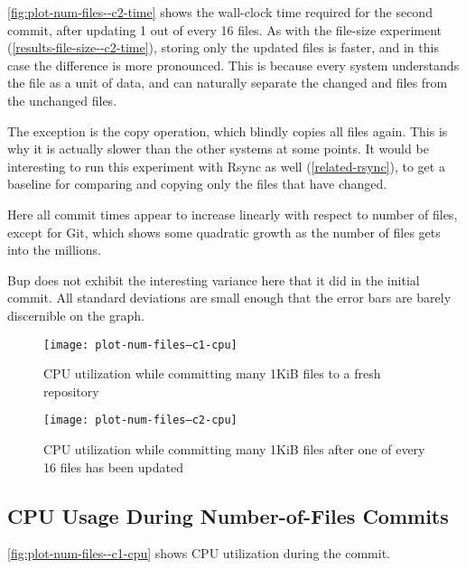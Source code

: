 \autoref{fig:plot-num-files--c2-time} shows the wall-clock time required for the
second \gls{commit}, after updating \num{1} out of every \num{16} files. As with
the file-size experiment (\autoref{results-file-size--c2-time}), storing only
the updated files is faster, and in this case the difference is more pronounced.
This is because every system understands the file as a unit of data, and can
naturally separate the changed and files from the unchanged files.

The exception is the copy operation, which blindly copies all files again. This
is why it is actually slower than the other systems at some points. It would be
interesting to run this experiment with Rsync as well (\autoref{related-rsync}),
to get a baseline for comparing and copying only the files that have changed.

Here all commit times appear to increase linearly with respect to number of
files, except for Git, which shows some quadratic growth as the number of files
gets into the millions.

Bup does not exhibit the interesting variance here that it did in the initial
commit. All standard deviations are small enough that the error bars are barely
discernible on the graph.

%


\begin{figure}[p]
    \caption{CPU utilization while committing many 1KiB files to a fresh
    repository}
    \label{fig:plot-num-files--c1-cpu}
    \centering
    \texttt{[image: plot-num-files--c1-cpu]}
\end{figure}

\begin{figure}[p]
    \caption{CPU utilization while committing many 1KiB files after one of every
        \num{16} files has been updated}
    \label{fig:plot-num-files--c2-cpu}
    \centering
    \texttt{[image: plot-num-files--c2-cpu]}
\end{figure}

\cleardoublepage

\subsection{CPU Usage During Number-of-Files Commits}

\autoref{fig:plot-num-files--c1-cpu} shows CPU utilization during the
\gls{commit}.


%


